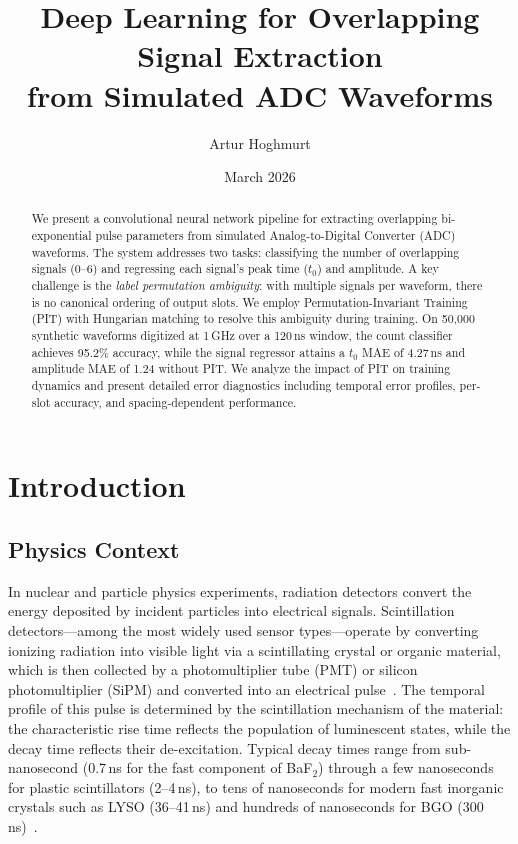 \documentclass[11pt,twocolumn]{article}
\title{Deep Learning for Overlapping Signal Extraction\\from Simulated ADC Waveforms}
\author{Artur Hoghmurt}
\date{March 2026}
\begin{document}
\maketitle

\begin{abstract}
We present a convolutional neural network pipeline for extracting overlapping bi-exponential pulse parameters from simulated Analog-to-Digital Converter (ADC) waveforms.
The system addresses two tasks: classifying the number of overlapping signals (0--6) and regressing each signal's peak time ($t_0$) and amplitude.
A key challenge is the \emph{label permutation ambiguity}: with multiple signals per waveform, there is no canonical ordering of output slots.
We employ Permutation-Invariant Training (PIT) with Hungarian matching to resolve this ambiguity during training.
On 50{,}000 synthetic waveforms digitized at 1\,GHz over a 120\,ns window, the count classifier achieves 95.2\% accuracy, while the signal regressor attains a $t_0$ MAE of 4.27\,ns and amplitude MAE of 1.24 without PIT.
We analyze the impact of PIT on training dynamics and present detailed error diagnostics including temporal error profiles, per-slot accuracy, and spacing-dependent performance.
\end{abstract}

\section{Introduction}
\label{sec:intro}

\subsection{Physics Context}

In nuclear and particle physics experiments, radiation detectors convert the energy deposited by incident particles into electrical signals.
Scintillation detectors---among the most widely used sensor types---operate by converting ionizing radiation into visible light via a scintillating crystal or organic material, which is then collected by a photomultiplier tube (PMT) or silicon photomultiplier (SiPM) and converted into an electrical pulse~\cite{knoll2010radiation}.
The temporal profile of this pulse is determined by the scintillation mechanism of the material: the characteristic rise time reflects the population of luminescent states, while the decay time reflects their de-excitation.
Typical decay times range from sub-nanosecond (0.7\,ns for the fast component of BaF$_2$) through a few nanoseconds for plastic scintillators (2--4\,ns), to tens of nanoseconds for modern fast inorganic crystals such as LYSO (36--41\,ns) and hundreds of nanoseconds for BGO (300\,ns)~\cite{spieler2005semiconductor}.
\end{document}
